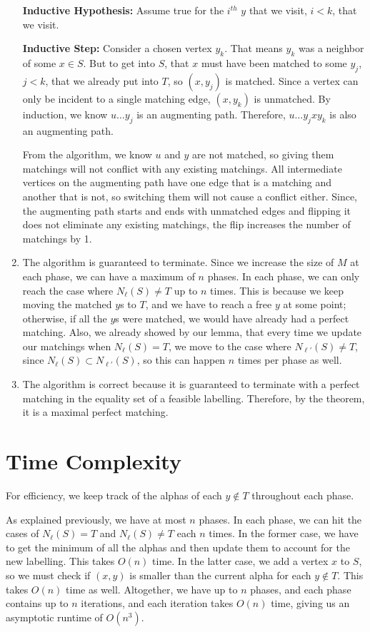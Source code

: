 \documentclass[12pt]{article}
\begin{document}
\begin{enumerate}
  \textbf{Inductive Hypothesis: } Assume true for the $i^{th}$ $y$ that we visit, $i < k$, that we visit.

  \textbf{Inductive Step: } Consider a chosen vertex $y_k$. That means $y_k$ was a neighbor of some $x \in S$. But to get into $S$, that $x$ must have been matched to some $y_j$, $j < k$, that we already put into $T$, so $(x, y_j)$ is matched. Since a vertex can only be incident to a single matching edge, $(x, y_k)$ is unmatched. By induction, we know $u\ldots y_j$ is an augmenting path. Therefore, $u\ldots y_jxy_k$ is also an augmenting path.

  From the algorithm, we know $u$ and $y$ are not matched, so giving them matchings will not conflict with any existing matchings. All intermediate vertices on the augmenting path have one edge that is a matching and another that is not, so switching them will not cause a conflict either. Since, the augmenting path starts and ends with unmatched edges and flipping it does not eliminate any existing matchings, the flip increases the number of matchings by 1.


  \item The algorithm is guaranteed to terminate. Since we increase the size of $M$ at each phase, we can have a maximum of $n$ phases. In each phase, we can only reach the case where $N_\ell(S) \neq T$ up to $n$ times. This is because we keep moving the matched $y$s to $T$, and we have to reach a free $y$ at some point; otherwise, if all the $y$s were matched, we would have already had a perfect matching. Also, we already showed by our lemma, that every time we update our matchings when $N_\ell(S) = T$, we move to the case where $N_{\ell'}(S) \neq T$, since $N_{\ell}(S) \subset N_{\ell'}(S)$, so this can happen $n$ times per phase as well.

\item The algorithm is correct because it is guaranteed to terminate with a perfect matching in the equality set of a feasible labelling. Therefore, by the theorem, it is a maximal perfect matching.
\end{enumerate}


\section*{Time Complexity}

For efficiency, we keep track of the alphas of each $y \notin T$ throughout each phase.

As explained previously, we have at most $n$ phases. In each phase, we can hit the cases of $N_\ell(S) = T$ and $N_\ell(S) \neq T$ each $n$ times. In the former case, we have to get the minimum of all the alphas and then update them to account for the new labelling. This takes $O(n)$ time. In the latter case, we add a vertex $x$ to $S$, so we must check if $(x, y)$ is smaller than the current alpha for each $y \notin T$. This takes $O(n)$ time as well. Altogether, we have up to $n$ phases, and each phase contains up to $n$ iterations, and each iteration takes $O(n)$ time, giving us an asymptotic runtime of $O(n^3)$.
\end{document}
